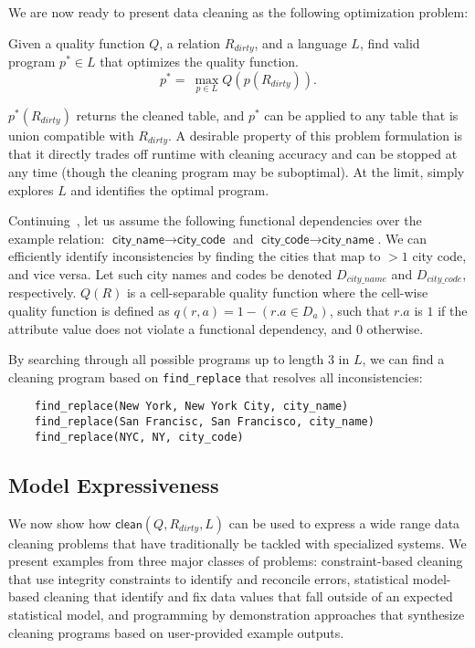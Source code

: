 \noindent We are now ready to present data cleaning as the following optimization problem:
\begin{problem}
Given a quality function $Q$, a relation $R_{dirty}$, and a language $L$, find valid program $p^* \in L$ that optimizes the quality function.
\[
p^* = ~ \max_{p \in L} Q( p(R_{dirty}) ).  
\]
\end{problem}
$p^*(R_{dirty})$ returns the cleaned table, and $p^*$ can be applied to any table that is union compatible with $R_{dirty}$.
A desirable property of this problem formulation is that it directly trades off runtime with cleaning accuracy and can be stopped at any time (though the cleaning program may be suboptimal).  At the limit, \sys simply explores $L$ and identifies the optimal program.


\begin{example}\label{ex3}
Continuing~, let us assume the following functional dependencies over the example relation: $\textsf{city\_name} \rightarrow \textsf{city\_code}$ and $\textsf{city\_code} \rightarrow \textsf{city\_name}$.
We can efficiently identify inconsistencies by finding the cities that map to $>1$ city code, and vice versa.   Let such city names and codes be denoted $D_{city\_name}$ and $D_{city\_code}$, respectively.
$Q(R)$ is a cell-separable quality function where the cell-wise quality function is defined as $q(r, a) = 1 - (r.a \in D_a)$, such that $r.a$ is $1$ if the attribute value does not violate a functional dependency, and $0$ otherwise.

By searching through all possible programs up to length 3 in $L$, we can find a cleaning program based on \texttt{find\_replace} that resolves all inconsistencies:
\begin{lstlisting}
    find_replace(New York, New York City, city_name)
    find_replace(San Francisc, San Francisco, city_name)
    find_replace(NYC, NY, city_code)
\end{lstlisting}
\end{example}


\subsection{Model Expressiveness}
We now show how $\textsf{clean}(Q,R_{dirty},L)$ can be used to express a wide range data cleaning problems that have traditionally be tackled with specialized systems.  We present examples from three major classes of problems: constraint-based cleaning that use integrity constraints to identify and reconcile errors, statistical model-based  cleaning that identify and fix data values that fall outside of an expected statistical model, and programming by demonstration approaches that synthesize cleaning programs based on user-provided example outputs.  

